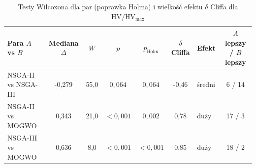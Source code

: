 \begin{table}[htbp]
    \centering
    \caption{Testy Wilcoxona dla par (poprawka Holma) i wielkość efektu $\delta$ Cliffa dla $\mathrm{HV}/\mathrm{HV}_{\max}$}
    \label{tab:pairwise}
    \begin{tabular}{l c c c c c l c}
        \hline
        Para $A$ vs $B$ & Mediana $\Delta$ & $W$ & $p$ & $p_{\text{Holm}}$ & $\delta$ Cliffa & Efekt & $A$ lepszy / $B$ lepszy \\
        \hline
        NSGA-II vs NSGA-III & -0{,}279 & 55{,}0 & $0{,}064$ & $0{,}064$ & -0{,}46 & średni & 6 / 14 \\
        NSGA-II vs MOGWO & 0{,}343 & 21{,}0 & $< 0{,}001$ & $0{,}002$ & 0{,}78 & duży & 17 / 3 \\
        NSGA-III vs MOGWO & 0{,}636 & 8{,}0 & $< 0{,}001$ & $< 0{,}001$ & 0{,}85 & duży & 18 / 2 \\
        \hline
    \end{tabular}
\end{table}
